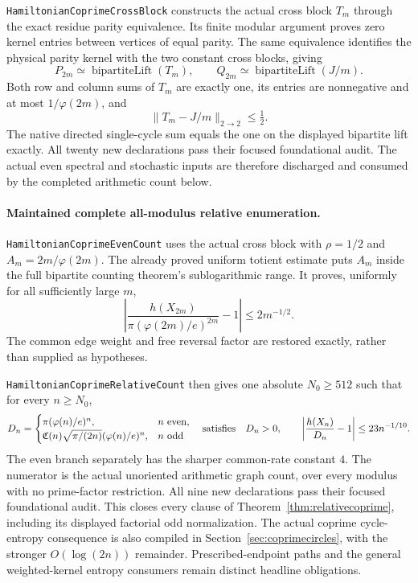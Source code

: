 \texttt{HamiltonianCoprimeCrossBlock} constructs the actual
cross block \(T_m\) through the exact residue parity equivalence.
Its finite modular argument proves zero kernel entries
between vertices of equal parity. The same equivalence
identifies the physical parity kernel with the two
constant cross blocks, giving
\[
 P_{2m}\simeq\operatorname{bipartiteLift}(T_m),\qquad
 Q_{2m}\simeq\operatorname{bipartiteLift}(J/m).
\]
Both row and column sums of \(T_m\) are exactly one,
its entries are nonnegative and at most \(1/\varphi(2m)\), and
\[
 \|T_m-J/m\|_{2\to2}\leq\tfrac12.
\]
The native directed single-cycle sum equals the one on the
displayed bipartite lift exactly.
All twenty new declarations pass their focused foundational
audit. The actual even spectral and stochastic inputs are
therefore discharged and consumed by the completed arithmetic
count below.

\paragraph{Maintained complete all-modulus relative enumeration.}
\texttt{HamiltonianCoprimeEvenCount} uses the actual cross block
with \(\rho=1/2\) and \(A_m=2m/\varphi(2m)\).
The already proved uniform totient estimate puts \(A_m\)
inside the full bipartite counting theorem's sublogarithmic
range. It proves, uniformly for all sufficiently large \(m\),
\[
 \left|\frac{h(X_{2m})}{\pi(\varphi(2m)/e)^{2m}}-1\right|
                                      \leq2m^{-1/2}.
\]
The common edge weight and free reversal factor are restored
exactly, rather than supplied as hypotheses.

\texttt{HamiltonianCoprimeRelativeCount} then gives one
absolute \(N_0\geq512\) such that for every \(n\geq N_0\),
\[
 D_n=
 \begin{cases}
 \pi(\varphi(n)/e)^n,&n\ {\rm even},\\
 \mathfrak C(n)\sqrt{\pi/(2n)}(\varphi(n)/e)^n,
                                      &n\ {\rm odd}
 \end{cases}
 \quad\hbox{satisfies}\quad
 D_n>0,\qquad
 \left|\frac{h(X_n)}{D_n}-1\right|\leq23n^{-1/10}.
\]
The even branch separately has the sharper common-rate
constant \(4\). The numerator is the actual unoriented arithmetic graph
count, over every modulus with no prime-factor restriction.
All nine new declarations pass their focused foundational
audit. This closes every clause of
Theorem~\ref{thm:relativecoprime}, including its displayed
factorial odd normalization.
The actual coprime cycle-entropy consequence is also compiled
in Section~\ref{sec:coprimecircles}, with the stronger
\(O(\log(2n))\) remainder.
Prescribed-endpoint paths and the general weighted-kernel
entropy consumers remain distinct headline obligations.

